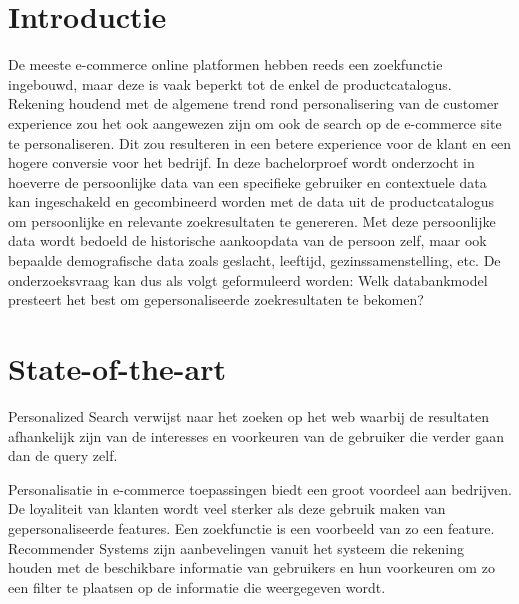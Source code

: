 
\section{Introductie} %
\label{sec:introductie}

De meeste e-commerce online platformen hebben reeds een zoekfunctie ingebouwd, maar deze is vaak beperkt tot de  enkel de productcatalogus. Rekening houdend met de algemene trend rond personalisering van de customer experience zou het ook aangewezen zijn om ook de search op de e-commerce site te personaliseren. Dit zou resulteren in een betere experience voor de klant en een hogere conversie voor het bedrijf. In deze bachelorproef wordt onderzocht in hoeverre de persoonlijke data van een specifieke gebruiker en contextuele data kan ingeschakeld en gecombineerd worden met de data uit de productcatalogus om persoonlijke en relevante zoekresultaten te genereren. 
Met deze persoonlijke data wordt bedoeld de historische aankoopdata van de persoon zelf, maar ook bepaalde demografische data zoals geslacht, leeftijd, gezinssamenstelling, etc. De onderzoeksvraag kan dus als volgt geformuleerd worden: Welk databankmodel presteert het best om gepersonaliseerde zoekresultaten te bekomen?



\section{State-of-the-art}
\label{sec:state-of-the-art}

Personalized Search \autocite{Pitkow2002} verwijst naar het zoeken op het web waarbij de resultaten afhankelijk zijn van de interesses en voorkeuren van de gebruiker die verder gaan dan de query zelf. 

Personalisatie in e-commerce toepassingen biedt een groot voordeel aan bedrijven. De loyaliteit van klanten wordt veel sterker als deze gebruik maken van gepersonaliseerde features.\autocite{Telang2005} Een zoekfunctie is een voorbeeld van zo een feature.
Recommender Systems \autocite{Resnick1997} zijn aanbevelingen vanuit het systeem die rekening houden met de beschikbare informatie van gebruikers en hun voorkeuren om zo een filter te plaatsen op de informatie die weergegeven wordt. 

